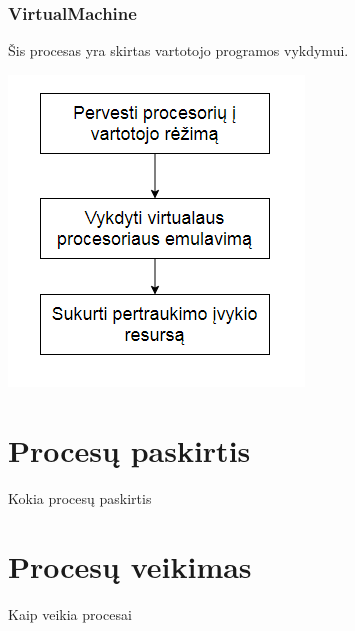 \documentclass{scrartcl}
\begin{document}
      \subsubsection{VirtualMachine}
        Šis procesas yra skirtas vartotojo programos vykdymui.
        \begin{center}
          \includegraphics[scale=1]{VirtualMachine}
        \end{center}


    \section{Procesų paskirtis}
    Kokia procesų paskirtis
    \section{Procesų veikimas}
    Kaip veikia procesai
\end{document}
